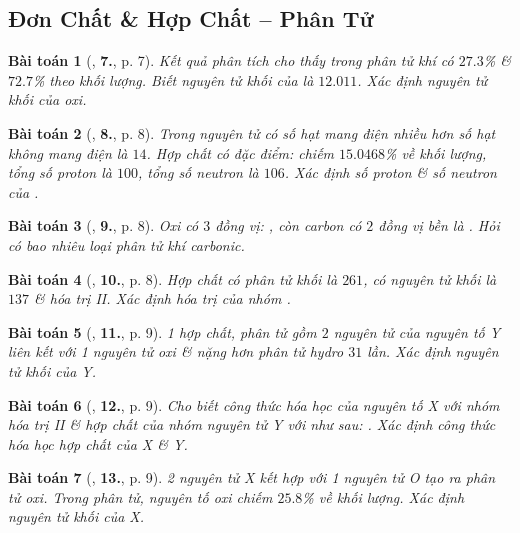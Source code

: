 \documentclass{article}
\numberwithin{equation}{section}
\newtheorem{baitoan}{Bài toán}[section]
\begin{document}

\subsection{Đơn Chất \& Hợp Chất -- Phân Tử}

\begin{baitoan}[\cite{An2011}, \textbf{7.}, p. 7]
	Kết quả phân tích cho thấy trong phân tử khí  có $27.3$\% \& $72.7$\%  theo khối lượng. Biết nguyên tử khối của  là $12.011$. Xác định nguyên tử khối của oxi.
\end{baitoan}

\begin{baitoan}[\cite{An2011}, \textbf{8.}, p. 8]
	Trong nguyên tử  có số hạt mang điện nhiều hơn số hạt không mang điện là $14$. Hợp chất  có đặc điểm:  chiếm $15.0468$\% về khối lượng, tổng số proton là $100$, tổng số neutron là $106$. Xác định số proton \& số neutron của .
\end{baitoan}

\begin{baitoan}[\cite{An2011}, \textbf{9.}, p. 8]
	Oxi có $3$ đồng vị: , còn carbon có $2$ đồng vị bền là . Hỏi có bao nhiêu loại phân tử khí carbonic.
\end{baitoan}

\begin{baitoan}[\cite{An2011}, \textbf{10.}, p. 8]
	Hợp chất  có phân tử khối là $261$,  có nguyên tử khối là $137$ \& hóa trị II. Xác định hóa trị của nhóm .
\end{baitoan}

\begin{baitoan}[\cite{An2011}, \textbf{11.}, p. 9]
	1 hợp chất, phân tử gồm $2$ nguyên tử của nguyên tố Y liên kết với 1 nguyên tử oxi \& nặng hơn phân tử hydro $31$ lần. Xác định nguyên tử khối của Y.
\end{baitoan}

\begin{baitoan}[\cite{An2011}, \textbf{12.}, p. 9]
	Cho biết công thức hóa học của nguyên tố X với nhóm  hóa trị II \& hợp chất của nhóm nguyên tử Y với  như sau: . Xác định công thức hóa học hợp chất của X \& Y.
\end{baitoan}

\begin{baitoan}[\cite{An2011}, \textbf{13.}, p. 9]
	2 nguyên tử X kết hợp với 1 nguyên tử O tạo ra phân tử oxi. Trong phân tử, nguyên tố oxi chiếm $25.8$\% về khối lượng. Xác định nguyên tử khối của X.
\end{baitoan}
\end{document}
